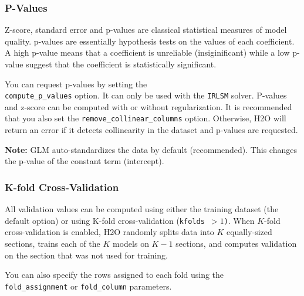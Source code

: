 \waterExampleInR



\subsubsection{P-Values}
Z-score, standard error and p-values are classical statistical measures of model quality. p-values are essentially
hypothesis tests on the values of each coefficient. A high p-value means that a coefficient is unreliable
(insiginificant) while a low p-value suggest that the coefficient is statistically significant.

You can request p-values by setting the \\\texttt{compute\_p\_values} option. It can only be used with the
\texttt{IRLSM} solver. P-values and z-score can be computed with or without regularization. It is recommended that you also set the \texttt{remove\_collinear\_columns} option. Otherwise, H2O will return an error if it detects collinearity in the dataset and p-values are requested. 

\textbf{Note:} GLM auto-standardizes the data by default (recommended). This changes the p-value of the constant term
(intercept).

\waterExampleInR



\subsubsection{K-fold Cross-Validation}

All validation values can be computed using either the training dataset (the default option) or using K-fold
cross-validation (\texttt{kfolds $> 1$)}. When $K$-fold cross-validation is enabled, H2O randomly splits data into $K$
equally-sized sections, trains each of the $K$ models on $K-1$ sections, and computes validation on the section that was not
used for training.

You can also specify the rows assigned to each fold using the\\ \texttt{fold\_assignment}
or \texttt{fold\_column} parameters.

\waterExampleInR


\waterExampleInPython


